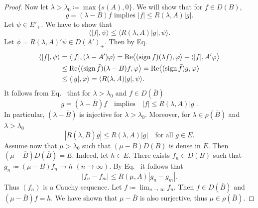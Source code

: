\begin{proof}
Now let $\lambda > \lambda_{0} \coloneq \max\{s(A),0\}$. 
We will show that for $f \in D(B)$,
\begin{equation}\label{eq:c2-4.6}
g = (\lambda - B)f \text{ implies } |f| \leq R(\lambda,A)|g|.
\end{equation}
Let $\psi \in E'_{+}$. 
We have to show that 
\[
\langle|f|,\psi\rangle \leq \langle R(\lambda,A)|g|,\psi\rangle .
\]
Let $\phi = R(\lambda,A)'\psi \in D(A')_{+}$. 
Then by Eq.~
\begin{align*}
\langle|f|,\psi\rangle &= \langle|f|, (\lambda - A')\phi\rangle 
= \Re\mleft\langle(\sign  \bar{f})(\lambda f),\phi\rangle - \langle|f|,A'\phi\mright\rangle\\
&\leq \Re\mleft\langle(\sign  \bar{f})(\lambda - B)f,\phi\mright\rangle = \Re\mleft\langle(\sign  \bar{f})g,\phi\mright\rangle\\
&\leq \langle|g|,\phi\rangle = \langle R(\lambda,A)|g|,\psi\rangle.
\end{align*}
It follows from Eq.~ that for $\lambda > \lambda_{0}$ and $f \in D(\overline{B})$
\begin{equation}\label{eq:c2-4.7}
g = (\lambda - \overline{B})f \quad\text{implies}\quad |f| \leq R(\lambda,A)|g|.
\end{equation}
In particular, $(\lambda - \overline{B})$ is injective for $\lambda > \lambda_{0}$. 
Moreover, for $\lambda \in \rho(\overline{B})$ and 
$\lambda > \lambda_{0}$
\begin{equation}\label{eq:c2-4.8}
|R(\lambda,\overline{B})g| \leq R(\lambda,A)|g| \quad \text{for all } g \in E .
\end{equation}
Assume now that $\mu > \lambda_{0}$ such that $(\mu - B)D(B)$ is dense in $E$. 
Then 
$(\mu - \overline{B})D(\overline{B}) = E$. 
Indeed, let $h \in E$. 
There exists $f_{n} \in D(B)$ such that $g_{n} \coloneq (\mu - B)f_{n} \to h$ $(n \to \infty)$. 
By Eq.~ it follows that 
\[
|f_{n} - f_{m}| \leq R(\mu,A)|g_{n} - g_{m}| .
\] 
Thus $(f_{n})$ is a Cauchy sequence. 
Let $f \coloneq \lim_{n \to \infty} f_{n}$. 
Then $f \in D(\overline{B})$ and $(\mu - \overline{B})f = h$. We have shown that $\mu - \overline{B}$ is also surjective, thus $\mu \in \rho(\overline{B})$.


\end{proof}
